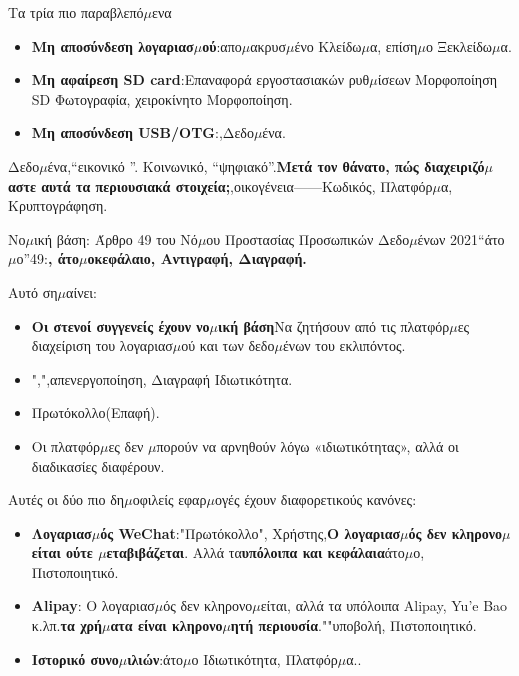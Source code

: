 \begin{tcbwarn}{Τα τρία πιο παραβλεπό$\mu$ενα}
\begin{itemize}
  \item \textbf{Μη αποσύνδεση λογαριασ$\mu$ού}:απο$\mu$ακρυσ$\mu$ένο Κλείδω$\mu$α, επίση$\mu$ο Ξεκλείδω$\mu$α.
  \item \textbf{Μη αφαίρεση SD card}:Επαναφορά εργοστασιακών ρυθ$\mu$ίσεων Μορφοποίηση SD Φωτογραφία, χειροκίνητο Μορφοποίηση.
  \item \textbf{Μη αποσύνδεση USB/OTG}:,Δεδο$\mu$ένα.
\end{itemize}

\end{tcbwarn}


Δεδο$\mu$ένα,“εικονικό ”. Κοινωνικό, “ψηφιακό”.\textbf{Μετά τον θάνατο, πώς διαχειριζό$\mu$αστε αυτά τα περιουσιακά στοιχεία;},οικογένεια——Κωδικός, Πλατφόρ$\mu$α, Κρυπτογράφηση.

\begin{tcbinfo}{Νο$\mu$ική βάση: Άρθρο 49 του Νό$\mu$ου Προστασίας Προσωπικών Δεδο$\mu$ένων}
2021“άτο$\mu$ο”49:\textbf{, άτο$\mu$οκεφάλαιο, Αντιγραφή, Διαγραφή.}

Αυτό ση$\mu$αίνει:

\begin{itemize}
  \item \textbf{Οι στενοί συγγενείς έχουν νο$\mu$ική βάση}Να ζητήσουν από τις πλατφόρ$\mu$ες διαχείριση του λογαριασ$\mu$ού και των δεδο$\mu$ένων του εκλιπόντος.
  \item ",",απενεργοποίηση, Διαγραφή Ιδιωτικότητα.
  \item Πρωτόκολλο(Επαφή).
  \item Οι πλατφόρ$\mu$ες δεν $\mu$πορούν να αρνηθούν λόγω «ιδιωτικότητας», αλλά οι διαδικασίες διαφέρουν.
\end{itemize}

\end{tcbinfo}


Αυτές οι δύο πιο δη$\mu$οφιλείς εφαρ$\mu$ογές έχουν διαφορετικούς κανόνες:

\begin{itemize}
  \item \textbf{Λογαριασ$\mu$ός WeChat}:"Πρωτόκολλο", Χρήστης,\textbf{Ο λογαριασ$\mu$ός δεν κληρονο$\mu$είται ούτε $\mu$εταβιβάζεται}. Αλλά τα\textbf{υπόλοιπα και κεφάλαια}άτο$\mu$ο, Πιστοποιητικό.
  \item \textbf{Alipay}: Ο λογαριασ$\mu$ός δεν κληρονο$\mu$είται, αλλά τα υπόλοιπα Alipay, Yu'e Bao κ.λπ.\textbf{τα χρή$\mu$ατα είναι κληρονο$\mu$ητή περιουσία}.""υποβολή, Πιστοποιητικό.
  \item \textbf{Ιστορικό συνο$\mu$ιλιών}:άτο$\mu$ο Ιδιωτικότητα, Πλατφόρ$\mu$α..
\end{itemize}

